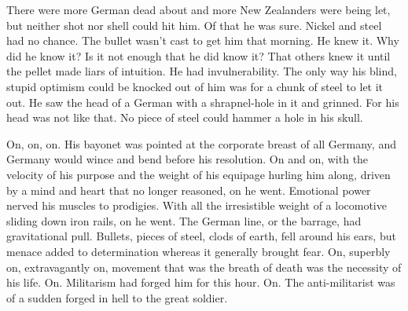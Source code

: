 There were more German dead about and more New Zealanders were being let, but neither shot nor shell could hit him. Of that he was sure. Nickel and steel had no chance. The bullet wasn't cast to get him that morning. He knew it. Why did he know it? Is it not enough that he did know it? That others knew it until the pellet made liars of intuition. He had invulnerability. The only way his blind, stupid optimism could be knocked out of him was for a chunk of steel to let it out. He saw the head of a German with a shrapnel-hole in it and grinned. For his head was not like that. No piece of steel could hammer a hole in his skull.

On, on, on. His bayonet was pointed at the corporate breast of all Germany, and Germany would wince and bend before his resolution. On and on, with the velocity of his purpose and the weight of his equipage hurling him along, driven by a mind and heart that no longer reasoned, on he went. Emotional power nerved his muscles to prodigies. With all the irresistible weight of a locomotive sliding down iron rails, on he went. The German line, or the barrage, had gravitational pull. Bullets, pieces of steel, clods of earth, fell around his ears, but menace added to determination whereas it generally brought fear. On, superbly on, extravagantly on, movement that was the breath of death was the necessity of his life. On. Militarism had forged him for this hour. On. The anti-militarist was of a sudden forged in hell to the great soldier.